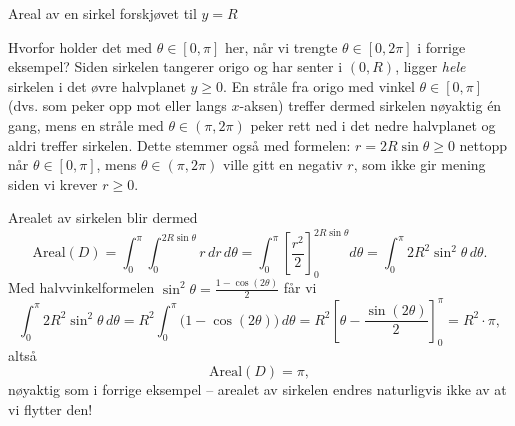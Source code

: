 \begin{eks}{Areal av en sirkel forskjøvet til $y=R$}
\begin{rem}{}
Hvorfor holder det med $\theta\in[0,\pi]$ her, når vi trengte $\theta\in[0,2\pi]$ i forrige eksempel? Siden sirkelen tangerer origo og har senter i $(0,R)$, ligger \emph{hele} sirkelen i det øvre halvplanet $y\geq 0$. En stråle fra origo med vinkel $\theta\in[0,\pi]$ (dvs. som peker opp mot eller langs $x$-aksen) treffer dermed sirkelen nøyaktig én gang, mens en stråle med $\theta\in(\pi,2\pi)$ peker rett ned i det nedre halvplanet og aldri treffer sirkelen. Dette stemmer også med formelen: $r=2R\sin\theta\geq 0$ nettopp når $\theta\in[0,\pi]$, mens $\theta\in(\pi,2\pi)$ ville gitt en negativ $r$, som ikke gir mening siden vi krever $r\geq 0$.
\end{rem}

Arealet av sirkelen blir dermed
\[
\text{Areal}(D) = \int_0^\pi \int_0^{2R\sin\theta} r\, dr\, d\theta = \int_0^\pi \left[\frac{r^2}{2}\right]_0^{2R\sin\theta} d\theta = \int_0^\pi 2R^2\sin^2\theta\, d\theta.
\]
Med halvvinkelformelen $\sin^2\theta = \tfrac{1-\cos(2\theta)}{2}$ får vi
\[
\int_0^\pi 2R^2\sin^2\theta\, d\theta = R^2\int_0^\pi \bigl(1-\cos(2\theta)\bigr)\, d\theta = R^2\left[\theta - \frac{\sin(2\theta)}{2}\right]_0^\pi = R^2 \cdot \pi,
\]
altså
\[
\text{Areal}(D) = \pi ,
\]
nøyaktig som i forrige eksempel -- arealet av sirkelen endres naturligvis ikke av at vi flytter den!
\end{eks}

